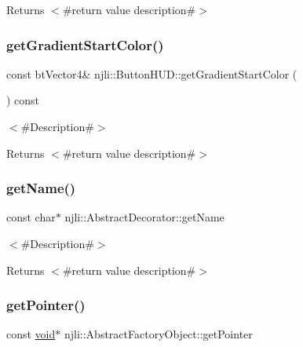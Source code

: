 \begin{DoxyReturn}{Returns}
$<$\#return value description\#$>$ 
\end{DoxyReturn}
\mbox{\label{classnjli_1_1_button_h_u_d_a7e8db31df5123c9d9a70f83aa4d1edb0}} 
\subsubsection{\texorpdfstring{get\+Gradient\+Start\+Color()}{getGradientStartColor()}}
{\footnotesize\ttfamily const bt\+Vector4\& njli\+::\+Button\+H\+U\+D\+::get\+Gradient\+Start\+Color (\begin{DoxyParamCaption}{ }\end{DoxyParamCaption}) const}

$<$\#\+Description\#$>$

\begin{DoxyReturn}{Returns}
$<$\#return value description\#$>$ 
\end{DoxyReturn}
\mbox{\label{classnjli_1_1_button_h_u_d_ad41266885be835f3ee602311e20877a4}} 
\subsubsection{\texorpdfstring{get\+Name()}{getName()}}
{\footnotesize\ttfamily const char$\ast$ njli\+::\+Abstract\+Decorator\+::get\+Name}

$<$\#\+Description\#$>$

\begin{DoxyReturn}{Returns}
$<$\#return value description\#$>$ 
\end{DoxyReturn}
\mbox{\label{classnjli_1_1_button_h_u_d_ac4ca71716ed832be357f15f8262c8448}} 
\subsubsection{\texorpdfstring{get\+Pointer()}{getPointer()}}
{\footnotesize\ttfamily const \mbox{\hyperlink{_thread_8h_af1e856da2e658414cb2456cb6f7ebc66}{void}}$\ast$ njli\+::\+Abstract\+Factory\+Object\+::get\+Pointer}

